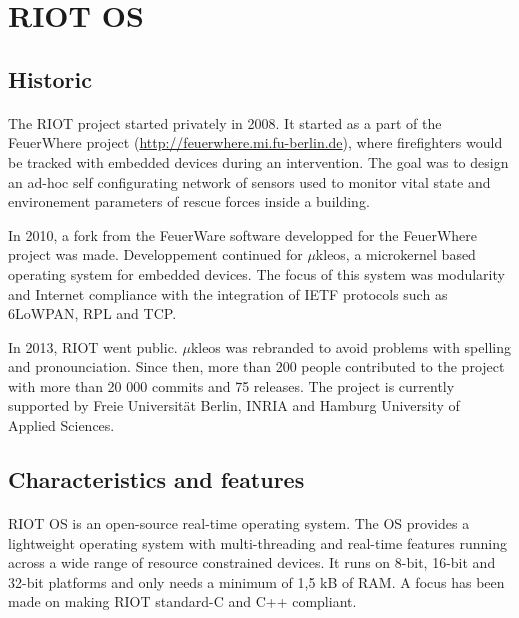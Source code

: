 \section{RIOT OS}

\subsection{Historic}
\paragraph{}
The RIOT project started privately in 2008.
It started as a part of the FeuerWhere project (\url{http://feuerwhere.mi.fu-berlin.de}), where firefighters would be tracked with embedded devices during an intervention.
The goal was to design an ad-hoc self configurating network of sensors used to monitor vital state and environement parameters of rescue forces inside a building.

In 2010, a fork from the FeuerWare software developped for the FeuerWhere project was made.
Developpement continued for $\mu$kleos, a microkernel based operating system for embedded devices.
The focus of this system was modularity and Internet compliance with the integration of IETF protocols such as 6LoWPAN, RPL and TCP.

In 2013, RIOT went public.
$\mu$kleos was rebranded to avoid problems with spelling and pronounciation.
Since then, more than 200 people contributed to the project with more than 20 000 commits and 75 releases.
The project is currently supported by Freie Universität Berlin, INRIA and Hamburg University of Applied Sciences.

\subsection{Characteristics and features}
\paragraph{}
RIOT OS is an open-source real-time operating system.
The OS provides a lightweight operating system with multi-threading and real-time features running across a wide range of resource constrained devices.
It runs on 8-bit, 16-bit and 32-bit platforms and only needs a minimum of 1,5 kB of RAM.
A focus has been made on making RIOT standard-C and C++ compliant.


